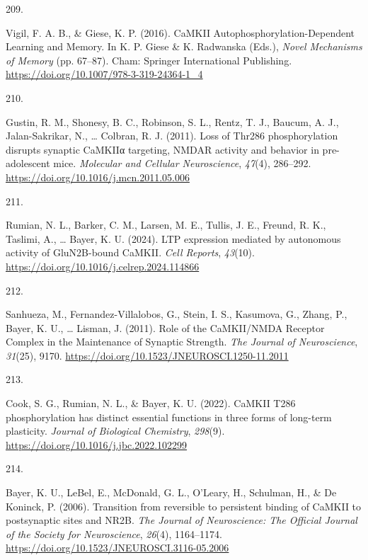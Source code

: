 \documentclass[
  11pt,
  letterpaper,
]{scrreprt}
\newlength{\cslhangindent}
\newlength{\csllabelwidth}
\newenvironment{CSLReferences}[2] %
 {\begin{list}{}{%
  \setlength{\itemindent}{0pt}
  \setlength{\leftmargin}{0pt}
  \setlength{\parsep}{0pt}
  \ifodd #1
   \setlength{\leftmargin}{\cslhangindent}
   \setlength{\itemindent}{-1\cslhangindent}
  \fi
  \setlength{\itemsep}{#2\baselineskip}}}
 {\end{list}}
\newcommand{\CSLLeftMargin}[1]{\parbox[t]{\csllabelwidth}{\strut#1\strut}}
\newcommand{\CSLRightInline}[1]{\parbox[t]{\linewidth - \csllabelwidth}{\strut#1\strut}}
\begin{document}
\begin{CSLReferences}{0}{0}
\CSLLeftMargin{209. }%
\CSLRightInline{Vigil, F. A. B., \& Giese, K. P. (2016). {CaMKII
Autophosphorylation-Dependent Learning} and {Memory}. In K. P. Giese \&
K. Radwanska (Eds.), \emph{Novel {Mechanisms} of {Memory}} (pp. 67--87).
Cham: Springer International Publishing.
\url{https://doi.org/10.1007/978-3-319-24364-1_4}}

\CSLLeftMargin{210. }%
\CSLRightInline{Gustin, R. M., Shonesy, B. C., Robinson, S. L., Rentz,
T. J., Baucum, A. J., Jalan-Sakrikar, N., \ldots{} Colbran, R. J.
(2011). Loss of {Thr286} phosphorylation disrupts synaptic {CaMKIIα}
targeting, {NMDAR} activity and behavior in pre-adolescent mice.
\emph{Molecular and Cellular Neuroscience}, \emph{47}(4), 286--292.
\url{https://doi.org/10.1016/j.mcn.2011.05.006}}

\CSLLeftMargin{211. }%
\CSLRightInline{Rumian, N. L., Barker, C. M., Larsen, M. E., Tullis, J.
E., Freund, R. K., Taslimi, A., \ldots{} Bayer, K. U. (2024). {LTP}
expression mediated by autonomous activity of {GluN2B-bound CaMKII}.
\emph{Cell Reports}, \emph{43}(10).
\url{https://doi.org/10.1016/j.celrep.2024.114866}}

\CSLLeftMargin{212. }%
\CSLRightInline{Sanhueza, M., Fernandez-Villalobos, G., Stein, I. S.,
Kasumova, G., Zhang, P., Bayer, K. U., \ldots{} Lisman, J. (2011). Role
of the {CaMKII}/{NMDA Receptor Complex} in the {Maintenance} of
{Synaptic Strength}. \emph{The Journal of Neuroscience}, \emph{31}(25),
9170. \url{https://doi.org/10.1523/JNEUROSCI.1250-11.2011}}

\CSLLeftMargin{213. }%
\CSLRightInline{Cook, S. G., Rumian, N. L., \& Bayer, K. U. (2022).
{CaMKII T286} phosphorylation has distinct essential functions in three
forms of long-term plasticity. \emph{Journal of Biological Chemistry},
\emph{298}(9). \url{https://doi.org/10.1016/j.jbc.2022.102299}}

\CSLLeftMargin{214. }%
\CSLRightInline{Bayer, K. U., LeBel, E., McDonald, G. L., O'Leary, H.,
Schulman, H., \& De Koninck, P. (2006). Transition from reversible to
persistent binding of {CaMKII} to postsynaptic sites and {NR2B}.
\emph{The Journal of Neuroscience: The Official Journal of the Society
for Neuroscience}, \emph{26}(4), 1164--1174.
\url{https://doi.org/10.1523/JNEUROSCI.3116-05.2006}}


\end{CSLReferences}
\end{document}
